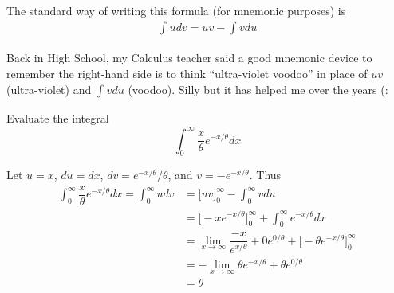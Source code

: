 \documentclass{article}
\begin{document}
\begin{enumerate}
    \begin{remark}
      The standard way of writing this formula (for mnemonic purposes) is
      \begin{align*}
        \int_{}^{} u dv = uv - \int_{}^{} v du
      \end{align*}

      Back in High School, my Calculus teacher said a good mnemonic device to remember the right-hand side is to think ``ultra-violet voodoo'' in place of $uv$ (ultra-violet) and $\int_{}^{} v du$ (voodoo). Silly but it has helped me over the years (:
    \end{remark}
    \begin{example}
      Evaluate the integral
      \[
        \int_{0}^{\infty} \dfrac{x}{\theta} e^{-x / \theta} dx
      \]

      Let $u = x$, $du = dx$, $dv = e^{-x / \theta} / \theta$, and $v = - e^{-x / \theta}$. Thus
      \begin{align*}
        \int_{0}^{\infty} \dfrac{x}{\theta} e^{-x / \theta} dx
        =
        \int_{0}^{\infty} u dv
        &
        =
        \Big[
          uv
        \Big]_{0}^{\infty}
        -
        \int_{0}^{\infty} v du
        \\
        &
        =
        \Big[
          - x e^{-x / \theta}
        \Big]_{0}^{\infty}
        +
        \int_{0}^{\infty} e^{-x / \theta} dx
        \\
        &
        =
        \lim_{x \to \infty} \dfrac{- x}{e^{x / \theta}}
        + 0 e^{0 / \theta}
        + \Big[
          - \theta
          e^{-x / \theta}
        \Big]_{0}^{\infty}
        \\
        &
        =
        - \lim_{x \to \infty} \theta e^{-x / \theta}
        + \theta e^{0 / \theta}
        \\
        &
        =
        \theta
      \end{align*}
    \end{example}
\end{enumerate}

\clearpage
\printindex

\end{document}
